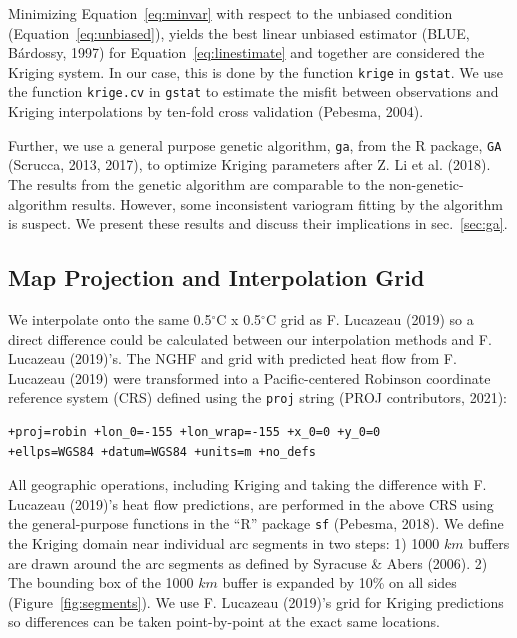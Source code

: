 \documentclass[draft,linenumbers]{agujournal2018}
\begin{document}
Minimizing Equation~\ref{eq:minvar} with respect to the unbiased
condition (Equation~\ref{eq:unbiased}), yields the best linear unbiased
estimator (BLUE, Bárdossy, 1997) for Equation~\ref{eq:linestimate} and
together are considered the Kriging system. In our case, this is done by
the function \texttt{krige} in \texttt{gstat}. We use the function
\texttt{krige.cv} in \texttt{gstat} to estimate the misfit between
observations and Kriging interpolations by ten-fold cross validation
(Pebesma, 2004).

Further, we use a general purpose genetic algorithm, \texttt{ga}, from
the R package, \texttt{GA} (Scrucca, 2013, 2017), to optimize Kriging
parameters after Z. Li et al. (2018). The results from the genetic
algorithm are comparable to the non-genetic-algorithm results. However,
some inconsistent variogram fitting by the algorithm is suspect. We
present these results and discuss their implications in
sec.~\ref{sec:ga}.

\subsection{Map Projection and Interpolation Grid}

We interpolate onto the same 0.5\(^{\circ}\)C x 0.5\(^{\circ}\)C grid as
F. Lucazeau (2019) so a direct difference could be calculated between
our interpolation methods and F. Lucazeau (2019)'s. The NGHF and grid
with predicted heat flow from F. Lucazeau (2019) were transformed into a
Pacific-centered Robinson coordinate reference system (CRS) defined
using the \texttt{proj} string (PROJ contributors, 2021):

\begin{verbatim}
+proj=robin +lon_0=-155 +lon_wrap=-155 +x_0=0 +y_0=0
+ellps=WGS84 +datum=WGS84 +units=m +no_defs
\end{verbatim}

All geographic operations, including Kriging and taking the difference
with F. Lucazeau (2019)'s heat flow predictions, are performed in the
above CRS using the general-purpose functions in the ``R'' package
\texttt{sf} (Pebesma, 2018). We define the Kriging domain near
individual arc segments in two steps: 1) 1000 \(km\) buffers are drawn
around the arc segments as defined by Syracuse \& Abers (2006). 2) The
bounding box of the 1000 \(km\) buffer is expanded by 10\% on all sides
(Figure~\ref{fig:segments}). We use F. Lucazeau (2019)'s grid for
Kriging predictions so differences can be taken point-by-point at the
exact same locations.
\end{document}
